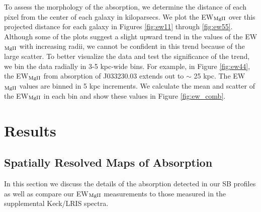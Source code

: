 \documentclass[twocolumn]{aastex61}
\begin{document}
To assess the morphology of the  absorption, we determine the distance of each pixel from the center of each galaxy in kiloparsecs. We plot the EW$_{\rm{MgII}}$ over this projected distance for each galaxy in Figures \ref{fig:ew11} through \ref{fig:ew55}. Although some of the plots suggest a slight upward trend in the values of the EW$_{\rm{MgII}}$ with increasing radii, we cannot be confident in this trend because of the large scatter. To better visualize the data and test the significance of the trend, we bin the data radially in 3-5 kpc-wide bins. For example, in Figure \ref{fig:ew44}, the EW$_{\rm{MgII}}$ from absorption of J033230.03 extends out to $\sim$ 25 kpc. The EW$_{\rm{MgII}}$ values are binned in 5 kpc increments. We calculate the mean and scatter of the EW$_{\rm{MgII}}$ in each bin and show these values in Figure \ref{fig:ew_comb}.   

\section{Results}\label{sec:results}

\subsection{Spatially Resolved Maps of  Absorption}
In this section we discuss the details of the absorption detected in our SB profiles as well as compare our EW$_{\rm{MgII}}$ measurements to those measured in the supplemental Keck/LRIS spectra. 
\end{document}
